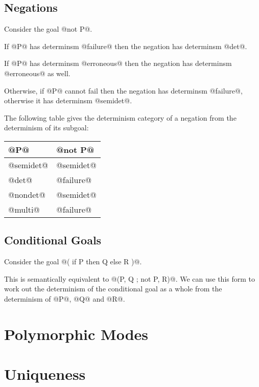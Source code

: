 \subsection{Negations}

Consider the goal @not P@.

If @P@ has determinsm @failure@ then the negation has determinsm @det@.

If @P@ has determinsm @erroneous@ then the negation has determinsm
@erroneous@ as well.

Otherwise, if @P@ cannot fail then the negation has determinsm
@failure@, otherwise it has determinsm @semidet@.

The following table gives the determinism category of a negation from
the determinism of its subgoal:

\begin{center}
\begin{tabular}{l|l}
@P@           & @not P@ \\
\hline \hline
@semidet@     & @semidet@ \\
@det@         & @failure@ \\
@nondet@      & @semidet@ \\
@multi@       & @failure@ \\
\end{tabular}
\end{center}

\subsection{Conditional Goals}

Consider the goal @( if P then Q else R )@.

This is semantically equivalent to @(P, Q ; not P, R)@.  We can use this
form to work out the determinism of the conditional goal as a whole from
the determinism of @P@, @Q@ and @R@.

\section{Polymorphic Modes}


\section{Uniqueness}


